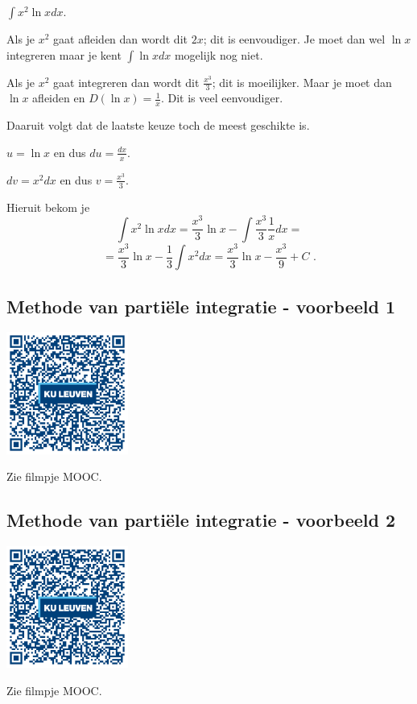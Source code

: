 \begin{voorbeeld}
	$\int x^2 \ln x dx$.

Als  je $x^2$ gaat afleiden dan wordt dit $2x$; dit is eenvoudiger. 
Je moet dan wel $\ln x$ integreren maar je kent $\int \ln x dx$ mogelijk nog niet.

Als je $x^2$ gaat integreren dan wordt dit $\frac{x^3}{3}$; dit is moeilijker.
Maar je moet dan $\ln x$ afleiden en $D (\ln x) = \frac{1}{x}$.
Dit is veel eenvoudiger.

Daaruit volgt dat de laatste keuze toch de meest geschikte is.

$u=\ln x$ en dus $du=\frac{dx}{x}$.

$dv=x^2dx$ en dus $v=\frac{x^3}{3}$.

Hieruit bekom je
\[
\int x^2 \ln x dx=\frac{x^3}{3} \ln x-\int \frac{x^3}{3}\frac{1}{x}dx=
\]
\[
=\frac{x^3}{3} \ln x-\frac{1}{3} \int x^2 dx=\frac{x^3}{3} \ln x -\frac{x^3}{9}+C \text { .}
\]

\end{voorbeeld}

\subsection{Methode van parti\"ele integratie - voorbeeld 1}
\begin{minipage}{.25\linewidth}
	\raggedright
	\includegraphics[width=4cm]{6_afgeleiden_integralen/inputs/QR_Code_PARTINTVB_module6_3new}
\end{minipage}
\begin{minipage}{.7\linewidth}
	Zie filmpje MOOC.
\end{minipage}


\subsection{Methode van parti\"ele integratie - voorbeeld 2}
\begin{minipage}{.25\linewidth}
	\raggedright
	\includegraphics[width=4cm]{6_afgeleiden_integralen/inputs/QR_Code_PARTINTVB2_module6_3new}
\end{minipage}
\begin{minipage}{.7\linewidth}
	Zie filmpje MOOC.
\end{minipage}


